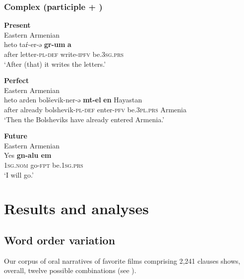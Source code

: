 \documentclass[output=paper,colorlinks,citecolor=brown,draftmode]{langscibook}
\begin{document}
\subsubsection{Complex (participle + )}


\ea\label{Armenian:ex:15}
\textbf{Present} \\
Eastern Armenian  \\
\gll heto taŕ-er-ə \textbf{gr-um} \textbf{a}  \\
after letter\textsc{-pl-def} write\textsc{-ipfv} be\textsc{.3sg.prs} \\
\glt `After (that) it writes the letters.'
\z

\ea\label{Armenian:ex:16}
\textbf{Perfect} \\
Eastern Armenian  \\
\gll heto arden bolševik-ner-ə \textbf{mt-el} \textbf{en} Hayastan  \\
after already bolshevik\textsc{-pl-def} enter\textsc{-pfv} be\textsc{.3pl.prs} Armenia \\
\glt `Then the Bolsheviks have already entered Armenia.'
\z

\ea\label{Armenian:ex:17}
\textbf{Future} \\
Eastern Armenian  \\
\gll Yes \textbf{gn-alu em}  \\
\textsc{1sg.nom} go\textsc{-fpt} be\textsc{.1sg.prs} \\
\glt `I will go.'
\z


\section{Results and analyses}\label{Armenian:ss:3}

\subsection{Word order variation}\label{Armenian:ss:3.1}

Our corpus of oral narratives of favorite films comprising 2,241 clauses shows, overall, twelve possible  combinations (see ).
\end{document}
